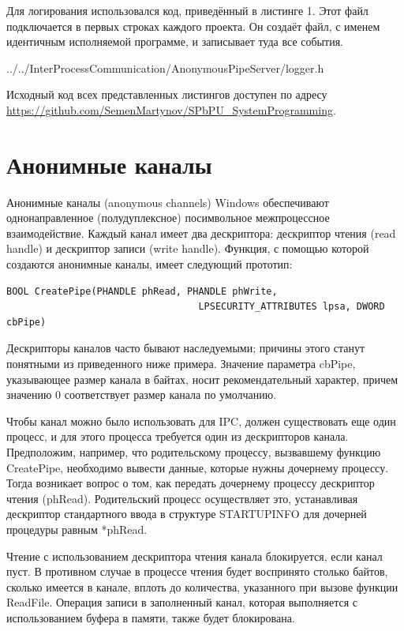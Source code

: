 \documentclass[a4paper, 12pt]{report}		%
\begin{document}
Для логирования использовался код, приведённый в листинге 1. Этот файл подключается в первых строках каждого проекта. Он создаёт файл, с именем идентичным исполняемой программе, и записывает туда все события.


{../../InterProcessCommunication/AnonymousPipeServer/logger.h}

\vspace{1em}
Исходный код всех представленных листингов доступен по адресу \\ \url{https://github.com/SemenMartynov/SPbPU_SystemProgramming}.

\chapter*{Анонимные каналы}

Анонимные каналы (anonymous channels) Windows обеспечивают однонаправленное (полудуплексное) посимвольное межпроцессное взаимодействие. Каждый канал имеет два дескриптора: дескриптор чтения (read handle) и дескриптор записи (write handle). Функция, с помощью которой создаются анонимные каналы, имеет следующий прототип:

\begin{verbatim}
BOOL CreatePipe(PHANDLE phRead, PHANDLE phWrite,
                                  LPSECURITY_ATTRIBUTES lpsa, DWORD cbPipe)
\end{verbatim}

Дескрипторы каналов часто бывают наследуемыми; причины этого станут понятными из приведенного ниже примера. Значение параметра cbPipe, указывающее размер канала в байтах, носит рекомендательный характер, причем значению 0 соответствует размер канала по умолчанию.

Чтобы канал можно было использовать для IPC, должен существовать еще один процесс, и для этого процесса требуется один из дескрипторов канала. Предположим, например, что родительскому процессу, вызвавшему функцию CreatePipe, необходимо вывести данные, которые нужны дочернему процессу. Тогда возникает вопрос о том, как передать дочернему процессу дескриптор чтения (phRead). Родительский процесс осуществляет это, устанавливая дескриптор стандартного ввода в структуре STARTUPINFO для дочерней процедуры равным *phRead.

Чтение с использованием дескриптора чтения канала блокируется, если канал пуст. В противном случае в процессе чтения будет воспринято столько байтов, сколько имеется в канале, вплоть до количества, указанного при вызове функции ReadFile. Операция записи в заполненный канал, которая выполняется с использованием буфера в памяти, также будет блокирована.
\end{document}
